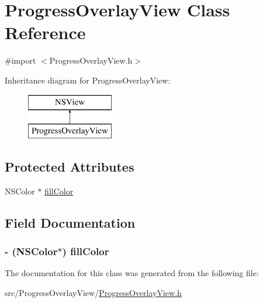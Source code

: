 \hypertarget{interface_progress_overlay_view}{\section{Progress\-Overlay\-View Class Reference}
\label{interface_progress_overlay_view}
}


{\ttfamily \#import $<$Progress\-Overlay\-View.\-h$>$}

Inheritance diagram for Progress\-Overlay\-View\-:\begin{figure}[H]
\begin{center}
\leavevmode
\includegraphics[height=2.000000cm]{interface_progress_overlay_view}
\end{center}
\end{figure}
\subsection*{Protected Attributes}
\begin{DoxyCompactItemize}
\item 
N\-S\-Color $\ast$ \hyperlink{interface_progress_overlay_view_aea825e0d7d4763b4d8ce88166280accb}{fill\-Color}
\end{DoxyCompactItemize}


\subsection{Field Documentation}
\hypertarget{interface_progress_overlay_view_aea825e0d7d4763b4d8ce88166280accb}{
\subsubsection[{fill\-Color}]{\setlength{\rightskip}{0pt plus 5cm}-\/ (N\-S\-Color$\ast$) fill\-Color\hspace{0.3cm}{\ttfamily [protected]}}}\label{interface_progress_overlay_view_aea825e0d7d4763b4d8ce88166280accb}


The documentation for this class was generated from the following file\-:\begin{DoxyCompactItemize}
\item 
src/\-Progress\-Overlay\-View/\hyperlink{_progress_overlay_view_8h}{Progress\-Overlay\-View.\-h}\end{DoxyCompactItemize}
